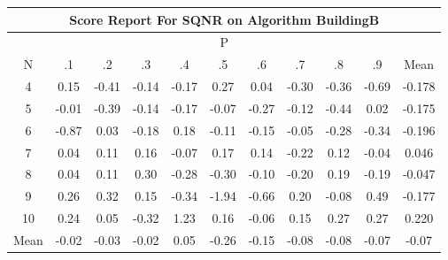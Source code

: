 \documentclass[11pt,a4paper]{report}
\begin{document}
\begin{longtable}{ | c || c | c | c | c | c | c | c | c | c || c |}
\hline
\multicolumn{11}{|c|}{ Score Report For SQNR on Algorithm BuildingB} \\
\hline
\multicolumn{11}{|c|}{ P } \\
\hline
N & .1 & .2 & .3 & .4 & .5 & .6 & .7 & .8 & .9 & Mean\\
 \hline
 \hline
 \endhead
  4 &  \cellcolor[HTML]{FFFFFF} 0.15 &  \cellcolor[HTML]{FFF7F7} -0.41 &  \cellcolor[HTML]{FFFFFF} -0.14 &  \cellcolor[HTML]{FFF7F7} -0.17 &  \cellcolor[HTML]{F7F7FF} 0.27 &  \cellcolor[HTML]{FFFFFF} 0.04 &  \cellcolor[HTML]{FFF7F7} -0.30 &  \cellcolor[HTML]{FFF7F7} -0.36 &  \cellcolor[HTML]{FFEFEF} -0.69 & -0.178 \\
  5 &  \cellcolor[HTML]{FFFFFF} -0.01 &  \cellcolor[HTML]{FFF7F7} -0.39 &  \cellcolor[HTML]{FFFFFF} -0.14 &  \cellcolor[HTML]{FFF7F7} -0.17 &  \cellcolor[HTML]{FFFFFF} -0.07 &  \cellcolor[HTML]{FFF7F7} -0.27 &  \cellcolor[HTML]{FFFFFF} -0.12 &  \cellcolor[HTML]{FFF7F7} -0.44 &  \cellcolor[HTML]{FFFFFF} 0.02 & -0.175 \\
  6 &  \cellcolor[HTML]{FFE7E7} -0.87 &  \cellcolor[HTML]{FFFFFF} 0.03 &  \cellcolor[HTML]{FFF7F7} -0.18 &  \cellcolor[HTML]{F7F7FF} 0.18 &  \cellcolor[HTML]{FFFFFF} -0.11 &  \cellcolor[HTML]{FFFFFF} -0.15 &  \cellcolor[HTML]{FFFFFF} -0.05 &  \cellcolor[HTML]{FFF7F7} -0.28 &  \cellcolor[HTML]{FFF7F7} -0.34 & -0.196 \\
  7 &  \cellcolor[HTML]{FFFFFF} 0.04 &  \cellcolor[HTML]{FFFFFF} 0.11 &  \cellcolor[HTML]{F7F7FF} 0.16 &  \cellcolor[HTML]{FFFFFF} -0.07 &  \cellcolor[HTML]{F7F7FF} 0.17 &  \cellcolor[HTML]{FFFFFF} 0.14 &  \cellcolor[HTML]{FFF7F7} -0.22 &  \cellcolor[HTML]{FFFFFF} 0.12 &  \cellcolor[HTML]{FFFFFF} -0.04 & 0.046 \\
  8 &  \cellcolor[HTML]{FFFFFF} 0.04 &  \cellcolor[HTML]{FFFFFF} 0.11 &  \cellcolor[HTML]{F7F7FF} 0.30 &  \cellcolor[HTML]{FFF7F7} -0.28 &  \cellcolor[HTML]{FFF7F7} -0.30 &  \cellcolor[HTML]{FFFFFF} -0.10 &  \cellcolor[HTML]{FFF7F7} -0.20 &  \cellcolor[HTML]{F7F7FF} 0.19 &  \cellcolor[HTML]{FFF7F7} -0.19 & -0.047 \\
  9 &  \cellcolor[HTML]{F7F7FF} 0.26 &  \cellcolor[HTML]{F7F7FF} 0.32 &  \cellcolor[HTML]{FFFFFF} 0.15 &  \cellcolor[HTML]{FFF7F7} -0.34 &  \cellcolor[HTML]{FFCFCF} -1.94 &  \cellcolor[HTML]{FFEFEF} -0.66 &  \cellcolor[HTML]{F7F7FF} 0.20 &  \cellcolor[HTML]{FFFFFF} -0.08 &  \cellcolor[HTML]{EFEFFF} 0.49 & -0.177 \\
  10 &  \cellcolor[HTML]{F7F7FF} 0.24 &  \cellcolor[HTML]{FFFFFF} 0.05 &  \cellcolor[HTML]{FFF7F7} -0.32 &  \cellcolor[HTML]{DFDFFF} 1.23 &  \cellcolor[HTML]{F7F7FF} 0.16 &  \cellcolor[HTML]{FFFFFF} -0.06 &  \cellcolor[HTML]{FFFFFF} 0.15 &  \cellcolor[HTML]{F7F7FF} 0.27 &  \cellcolor[HTML]{F7F7FF} 0.27 & 0.220 \\
 \hline
 \hline
Mean &  \cellcolor[HTML]{FFFFFF} -0.02 &  \cellcolor[HTML]{FFFFFF} -0.03 &  \cellcolor[HTML]{FFFFFF} -0.02 &  \cellcolor[HTML]{FFFFFF} 0.05 &  \cellcolor[HTML]{FFF7F7} -0.26 &  \cellcolor[HTML]{FFFFFF} -0.15 &  \cellcolor[HTML]{FFFFFF} -0.08 &  \cellcolor[HTML]{FFFFFF} -0.08 &  \cellcolor[HTML]{FFFFFF} -0.07 &  \cellcolor[HTML]{FFFFFF} -0.07
\end{longtable}
\end{document}
